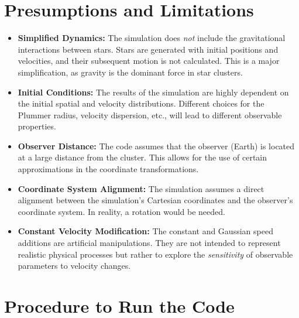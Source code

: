 \documentclass{article}
\begin{document}
	\section{Presumptions and Limitations}
	
	\begin{itemize}
		\item \textbf{Simplified Dynamics:} The simulation does \textit{not} include the gravitational interactions between stars. Stars are generated with initial positions and velocities, and their subsequent motion is not calculated. This is a major simplification, as gravity is the dominant force in star clusters.
		\item \textbf{Initial Conditions:} The results of the simulation are highly dependent on the initial spatial and velocity distributions. Different choices for the Plummer radius, velocity dispersion, etc., will lead to different observable properties. 
		\item \textbf{Observer Distance:} The code assumes that the observer (Earth) is located at a large distance from the cluster. This allows for the use of certain approximations in the coordinate transformations. 
		\item  \textbf{Coordinate System Alignment:} The simulation assumes a direct alignment between the simulation's Cartesian coordinates and the observer's coordinate system. In reality, a rotation would be needed.
		\item \textbf{Constant Velocity Modification:} The constant and Gaussian speed additions are artificial manipulations. They are not intended to represent realistic physical processes but rather to explore the \textit{sensitivity} of observable parameters to velocity changes.
	\end{itemize}
	
	\section{Procedure to Run the Code}
	
\end{document}
